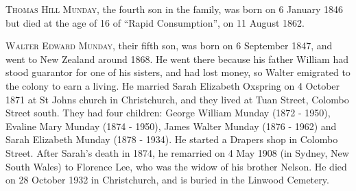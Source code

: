 \textsc{Thomas Hill Munday}, the fourth son in the family, was born on 6 January 1846 but died at the age of 16 of ``Rapid Consumption'', on 11 August 1862.

\textsc{Walter Edward Munday}, their fifth son, was born on 6 September 1847, and went to New Zealand around 1868. 	He went there because his father William had stood guarantor for one of his sisters, and had lost money, so Walter emigrated to the colony to earn a living. He married Sarah Elizabeth Oxspring on 4 October 1871 at St Johns church in Christchurch, and they lived at Tuan Street, Colombo Street south. They had four children: George William Munday (1872 - 1950),
Evaline Mary Munday (1874 - 1950), James Walter Munday (1876 - 1962) and Sarah Elizabeth Munday (1878 - 1934). He started a Drapers shop in Colombo Street.  After Sarah's death in 1874, he remarried on 4 May 1908 (in Sydney, New South Wales) to Florence Lee, who was the widow of his brother Nelson.  He died on 28 October 1932 in Christchurch, and is buried in the Linwood Cemetery.

